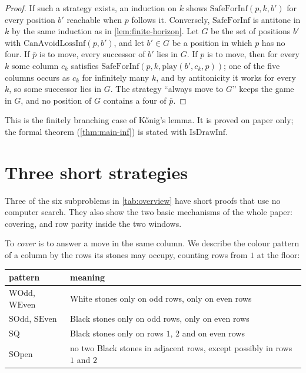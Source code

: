 \documentclass[11pt,a4paper]{article}
\theoremstyle{plain}
\theoremstyle{definition}
\begin{document}
\begin{proof}
If such a strategy exists, an induction on $k$ shows $\mathrm{SafeForInf}(p,k,b')$ for every position $b'$ reachable when $p$ follows it. Conversely, $\mathrm{SafeForInf}$ is antitone in $k$ by the same induction as in \cref{lem:finite-horizon}. Let $G$ be the set of positions $b'$ with $\mathrm{CanAvoidLossInf}(p,b')$, and let $b'\in G$ be a position in which $p$ has no four. If $\bar p$ is to move, every successor of $b'$ lies in $G$. If $p$ is to move, then for every $k$ some column $c_k$ satisfies $\mathrm{SafeForInf}(p,k,\mathrm{play}(b',c_k,p))$; one of the five columns occurs as $c_k$ for infinitely many $k$, and by antitonicity it works for every $k$, so some successor lies in $G$. The strategy ``always move to $G$'' keeps the game in $G$, and no position of $G$ contains a four of $\bar p$.
\end{proof}

This is the finitely branching case of K\H{o}nig's lemma. It is proved on paper only; the formal theorem (\cref{thm:main-inf}) is stated with $\mathrm{IsDrawInf}$.

\section{Three short strategies}
\label{sec:easy}

Three of the six subproblems in \cref{tab:overview} have short proofs that use no computer search. They also show the two basic mechanisms of the whole paper: covering, and row parity inside the two windows.

To \emph{cover} is to answer a move in the same column. We describe the colour pattern of a column by the rows its stones may occupy, counting rows from $1$ at the floor:

\begin{center}
\small
\begin{tabular}{@{}ll@{}}
\toprule
pattern & meaning \\
\midrule
$\mathrm{WOdd}$, $\mathrm{WEven}$ & White stones only on odd rows, only on even rows \\
$\mathrm{SOdd}$, $\mathrm{SEven}$ & Black stones only on odd rows, only on even rows \\
$\mathrm{SQ}$ & Black stones only on rows $1$, $2$ and on even rows \\
$\mathrm{SOpen}$ & no two Black stones in adjacent rows, except possibly in rows $1$ and $2$ \\
\bottomrule
\end{tabular}
\end{center}
\end{document}
